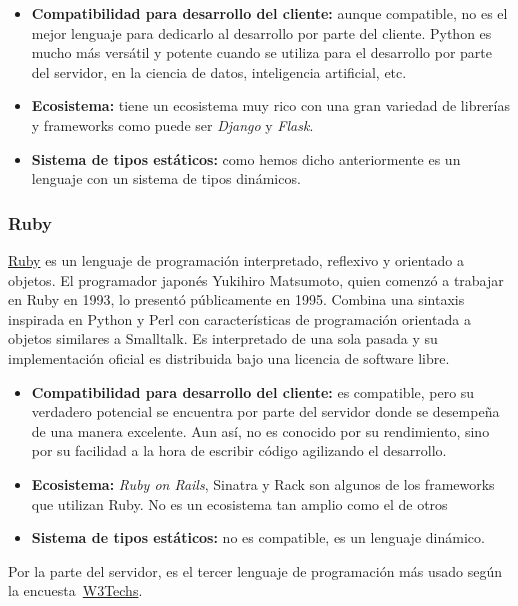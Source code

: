 \begin{itemize}
    \item[\mal] \textbf{Compatibilidad para desarrollo del cliente:} aunque compatible, no es el mejor lenguaje para dedicarlo al desarrollo por parte del cliente. Python es mucho más versátil y potente cuando se utiliza para el desarrollo por parte del servidor, en la ciencia de datos, inteligencia artificial, etc.
    \item[\bien] \textbf{Ecosistema:} tiene un ecosistema muy rico con una gran variedad de librerías y frameworks como puede ser \textit{Django} y \textit{Flask}.
    \item[\mal] \textbf{Sistema de tipos estáticos:} como hemos dicho anteriormente es un lenguaje con un sistema de tipos dinámicos.
\end{itemize}

\subsubsection{Ruby}

\href{https://es.wikipedia.org/w/index.php?title=Ruby&oldid=159723570}{Ruby} es un lenguaje de programación interpretado, reflexivo y orientado a objetos. El programador japonés Yukihiro Matsumoto, quien comenzó a trabajar en Ruby en 1993, lo presentó públicamente en 1995. Combina una sintaxis inspirada en Python y Perl con características de programación orientada a objetos similares a Smalltalk. Es interpretado de una sola pasada y su implementación oficial es distribuida bajo una licencia de software libre.

\begin{itemize}
    \item[\mal] \textbf{Compatibilidad para desarrollo del cliente:} es compatible, pero su verdadero potencial se encuentra por parte del servidor donde se desempeña de una manera excelente. Aun así, no es conocido por su rendimiento, sino por su facilidad a la hora de escribir código agilizando el desarrollo.
    \item[\bien] \textbf{Ecosistema:} \textit{Ruby on Rails}, Sinatra y Rack son algunos de los frameworks que utilizan Ruby. No es un ecosistema tan amplio como el de otros
    \item[\mal] \textbf{Sistema de tipos estáticos:} no es compatible, es un lenguaje dinámico.
\end{itemize}

Por la parte del servidor, es el tercer lenguaje de programación más usado según la encuesta~\href{https://w3techs.com/technologies/overview/programming_language}{W3Techs}.

